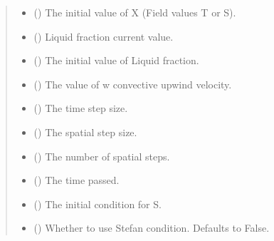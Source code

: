 \documentclass[a4paper,11pt,english,openany]{sphinxmanual}
\begin{document}
\begin{fulllineitems}
\begin{fulllineitems}
\begin{quote}
\begin{description}
\begin{itemize}
\item {} 
\sphinxAtStartPar
{} () \textendash{} The initial value of X (Field values T or S).

\item {} 
\sphinxAtStartPar
{} () \textendash{} Liquid fraction current value.

\item {} 
\sphinxAtStartPar
{} () \textendash{} The initial value of Liquid fraction.

\item {} 
\sphinxAtStartPar
{} () \textendash{} The value of w convective upwind velocity.

\item {} 
\sphinxAtStartPar
{} () \textendash{} The time step size.

\item {} 
\sphinxAtStartPar
{} () \textendash{} The spatial step size.

\item {} 
\sphinxAtStartPar
{} () \textendash{} The number of spatial steps.

\item {} 
\sphinxAtStartPar
{} () \textendash{} The time passed.

\item {} 
\sphinxAtStartPar
{} () \textendash{} The initial condition for S.

\item {} 
\sphinxAtStartPar
{} (\sphinxstyleliteralemphasis{\sphinxupquote{, }}) \textendash{} Whether to use Stefan condition. Defaults to False.


\end{itemize}
\end{description}
\end{quote}
\end{fulllineitems}
\end{fulllineitems}
\end{document}
